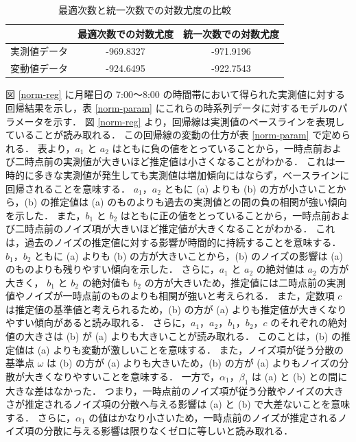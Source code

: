 \documentclass[technicalreport]{ieicej}
\begin{document}
\begin{table}[tb]
\centering
\caption{最適次数と統一次数での対数尤度の比較}
\label{more-param}
\begin{tabular}{|l|c|c|}
\hline
&最適次数での対数尤度&統一次数での対数尤度\\
\hline
実測値データ&-969.8327&-971.9196\\
\hline
変動値データ&-924.6495&-922.7543\\
\hline
\end{tabular}
\end{table}

図 \ref{norm-reg} に月曜日の 7:00～8:00 の時間帯において得られた実測値に対する回帰結果を示し，表 \ref{norm-param} にこれらの時系列データに対するモデルのパラメータを示す．
図 \ref{norm-reg} より，回帰線は実測値のベースラインを表現していることが読み取れる．
この回帰線の変動の仕方が表 \ref{norm-param} で定められる．
表より，$a_1$ と $a_2$ はともに負の値をとっていることから，一時点前および二時点前の実測値が大きいほど推定値は小さくなることがわかる．
これは一時的に多きな実測値が発生しても実測値は増加傾向にはならず，ベースラインに回帰されることを意味する．
$a_1，a_2$ ともに (a) よりも (b) の方が小さいことから，(b) の推定値は (a) のものよりも過去の実測値との間の負の相関が強い傾向を示した．
また，$b_1$ と $b_2$ はともに正の値をとっていることから，一時点前および二時点前のノイズ項が大きいほど推定値が大きくなることがわかる．
これは，過去のノイズの推定値に対する影響が時間的に持続することを意味する．
$b_1，b_2$ ともに (a) よりも (b) の方が大きいことから，(b) のノイズの影響は (a) のものよりも残りやすい傾向を示した．
さらに，$a_1$ と $a_2$ の絶対値は $a_2$ の方が大きく， $b_1$ と $b_2$ の絶対値も $b_2$ の方が大きいため，推定値には二時点前の実測値やノイズが一時点前のものよりも相関が強いと考えられる．
また，定数項 $c$ は推定値の基準値と考えられるため，(b) の方が (a) よりも推定値が大きくなりやすい傾向があると読み取れる．
さらに，$a_1，a_2，b_1，b_2，c$ のそれぞれの絶対値の大きさは (b) が (a) よりも大きいことが読み取れる．
このことは，(b) の推定値は (a) よりも変動が激しいことを意味する．
また，ノイズ項が従う分散の基準点 $\omega$ は (b) の方が (a) よりも大きいため，(b) の方が (a) よりもノイズの分散が大きくなりやすいことを意味する．
一方で，$\alpha_1，\beta_1$ は (a) と (b) との間に大きな差はなかった．
つまり，一時点前のノイズ項が従う分散やノイズの大きさが推定されるノイズ項の分散へ与える影響は (a) と (b) で大差ないことを意味する．
さらに，$\alpha_1$ の値はかなり小さいため，一時点前のノイズが推定されるノイズ項の分散に与える影響は限りなくゼロに等しいと読み取れる．
\end{document}
